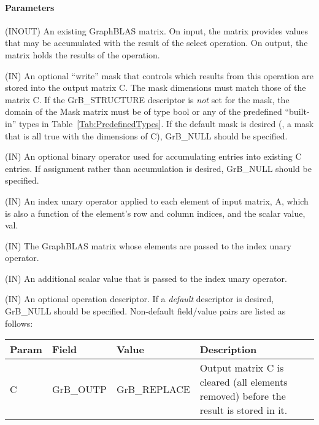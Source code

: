 \paragraph{Parameters}

\begin{itemize}[leftmargin=1.1in]
    \item[{\sf C}]    ({\sf INOUT}) An existing GraphBLAS matrix. On input,
    the matrix provides values that may be accumulated with the result of the
    select operation.  On output, the matrix holds the results of the
    operation.

    \item[{\sf Mask}] ({\sf IN}) An optional ``write'' mask that controls which
    results from this operation are stored into the output matrix {\sf C}. The 
    mask dimensions must match those of the matrix {\sf C}. If the 
    {\sf GrB\_STRUCTURE} descriptor is {\em not} set for the mask, the domain of the 
    {\sf Mask} matrix must be of type {\sf bool} or any of the predefined 
    ``built-in'' types in Table~\ref{Tab:PredefinedTypes}.  If the default
    mask is desired (\ie, a mask that is all {\sf true} with the dimensions of {\sf C}), 
    {\sf GrB\_NULL} should be specified.

    \item[{\sf accum}] ({\sf IN}) An optional binary operator used for accumulating
    entries into existing {\sf C} entries. If assignment rather than accumulation is
    desired, {\sf GrB\_NULL} should be specified.
{\color{red}
    \item[{\sf op}] ({\sf IN}) An index unary operator applied to each element of input 
    matrix, {\sf A}, which is also a function of the element's row and column indices,
    and the scalar value, {\sf val}.
}
    \item[{\sf A}] ({\sf IN}) The GraphBLAS matrix whose elements are passed 
    to the index unary operator.

    \item[{\sf val}] ({\sf IN}) An additional scalar value that is passed to the 
    index unary operator.

    \item[{\sf desc}] ({\sf IN}) An optional operation descriptor. If
    a \emph{default} descriptor is desired, {\sf GrB\_NULL} should be
    specified. Non-default field/value pairs are listed as follows:  \\

    \hspace*{-2em}\begin{tabular}{lllp{2.7in}}
        Param & Field  & Value & Description \\
        \hline
        {\sf C}    & {\sf GrB\_OUTP} & {\sf GrB\_REPLACE} & Output matrix {\sf C}
        is cleared (all elements removed) before the result is stored in it.\\


\end{tabular}
\end{itemize}
